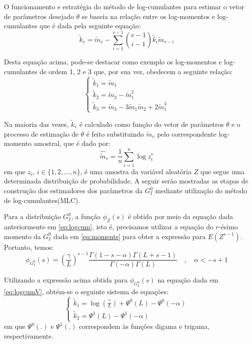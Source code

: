 \documentclass[12pt]{article}
\begin{document}
O funcionamento e estratégia do método de log-cumulantes para estimar o vetor de parâmetros desejado $\theta$ se baseia na relação entre os log-momentos e log-cumulantes que é dada pela seguinte equação:
\begin{equation}
    \tilde{k}_{v} = \tilde{m}_{v} - \sum_{i=1}^{v-1}\binom{v-1}{i-1}\tilde{k}_{i}\tilde{m}_{v-i}
\end{equation}

Desta equação acima, pode-se destacar como exemplo os log-momentos e log-cumulantes de ordem 1, 2 e 3 que, por sua vez, obedecem a seguinte relação:
\begin{equation}
    \left\{\begin{matrix}
        \tilde{k}_{1} = \tilde{m}_{1} \\ 
        \tilde{k}_{2} = \tilde{m}_{2} - \tilde{m}_{1}^{2} \\
        \tilde{k}_{3} = \tilde{m}_{3} - 3\tilde{m}_{1}\tilde{m}_{2} + 2\tilde{m}_{1}^{3} 
    \end{matrix}\right.
    \label{eq:logcum123}
\end{equation}

Na maioria das vezes, $\tilde{k}_{v}$ é calculado como função do vetor de parâmetros $\theta$ e o processo de estimação de $\theta$ é feito substituindo $\tilde{m}_{v}$ pelo correspondente log-momento amostral, que é dado por:
\begin{equation}
    \hat{\tilde{m}}_{v} = \frac{1}{n}\sum_{i=1}^{n}\log z_{i}^{v}
    \label{eq:log_momAmostrais}
\end{equation}
em que $z_i$, $i \in \{1, 2, \dots, n\}$, é uma amostra da variável aleatória $Z$ que segue uma determinada distribuição de probabilidade. A seguir serão mostradas as etapas de construção dos estimadores dos parâmetros da $G_I^0$ mediante utilização do método de log-cumulantes(MLC). 

Para a distribuição $G_I^0$, a função $\phi_{Z}(s)$ é obtida por meio da equação dada anteriormente em \eqref{eq:logcum}, isto é, precisamos utilizar a equação do $r$-ésimo momento da $G_I^0$ dada em \eqref{eq:moments} para obter a expressão para $E(Z^{s-1})$. Portanto, temos:
\begin{equation}
    \phi_{G_I^0}(s) = \left ( \frac{\gamma}{L} \right )^{s-1}\frac{\Gamma(1-s-\alpha)\Gamma(L+s-1)}{\Gamma(-\alpha)\Gamma(L)} \quad , \quad \alpha < -s+1
\end{equation}

Utilizando a expressão acima obtida para $\phi_{G_I^0}(s)$ na equação dada em \eqref{eq:logcumV}, obtém-se o seguinte sistema de equações:
\begin{equation}
    \left\{\begin{matrix}
        \tilde{k}_{1} = \log \left ( \frac{\gamma}{L} \right ) + \Psi^{0}(L) - \Psi^{0}(-\alpha)  \\ 
        \tilde{k}_{2} = \Psi^{1}(L) - \Psi^{1}(-\alpha)
    \end{matrix}\right.
\end{equation}
em que $\Psi^{0}(.)$ e $\Psi^{1}(.)$ correspondem às funções digama e trigama, respectivamente.
\end{document}
